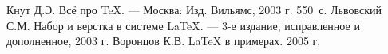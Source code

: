\documentclass[12pt,a4paper]{scrartcl}
\begin{document}
\begin{thebibliography}{9}
Кнут Д.Э. Всё про \TeX. \newblock --- Москва: Изд. Вильямс, 2003 г. 550~с.
Львовский С.М. Набор и верстка в системе \LaTeX{}. \newblock --- 3-е издание, исправленное и дополненное, 2003 г.
Воронцов К.В. \LaTeX{} в примерах. 2005 г.
\end{thebibliography}
\end{document}
